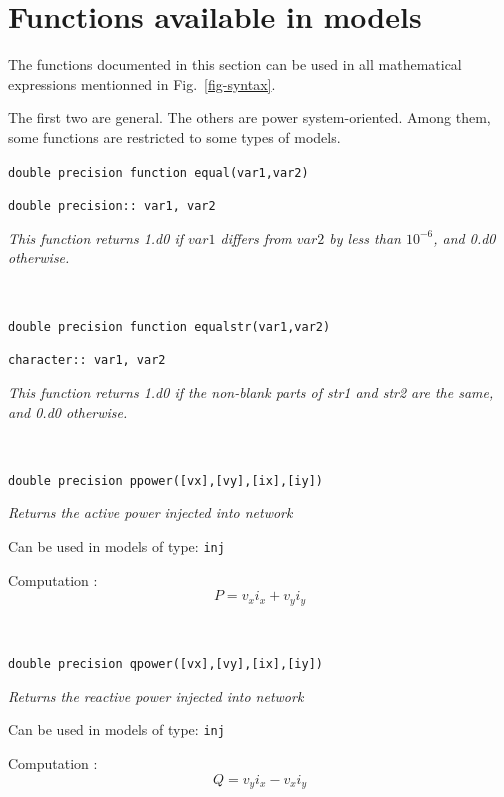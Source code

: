 \section{Functions available in models}

The functions documented in this section can be used in all mathematical expressions mentionned in Fig.~\ref{fig-syntax}.

The first two are general. The others are power system-oriented. Among them, some functions are restricted to some types of models.

\vspace*{2ex}

{\large \tt double precision function equal(var1,var2)}

\hspace*{10ex} {\tt double precision:: var1, var2}

{\it This function returns 1.d0 if $var1$ differs from $var2$ by less than $10^{-6}$, and 0.d0 otherwise.}

~ \hrulefill ~

{\large \tt double precision function equalstr(var1,var2)}

\hspace*{10ex} {\tt character:: var1, var2}

{\it This function returns 1.d0 if the non-blank parts of str1 and str2 are the same,  and 0.d0  otherwise.}


~ \hrulefill ~

{\large \tt double precision ppower([vx],[vy],[ix],[iy])}

{\it Returns the active power injected into network}

Can be used in models of type: {\tt inj}

Computation : 
\[ P = v_x i_x + v_y i_y \]

~ \hrulefill ~
 
{\large \tt double precision qpower([vx],[vy],[ix],[iy])}

{\it Returns the reactive power injected into network}

Can be used in models of type: {\tt inj}

Computation : 
\[ Q = v_y i_x - v_x i_y \]
 
~ \hrulefill ~

